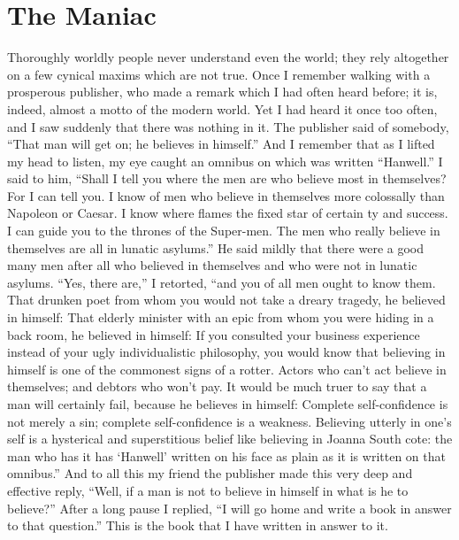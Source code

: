 \documentclass{book}
\begin{document}
\chapter{The Maniac}
\label{chapter-1}
Thoroughly worldly people never understand even the world; they rely altogether on a few cynical maxims which are not true. Once I remember walking with a prosperous publisher, who made a remark which I had often heard before; it is, indeed, almost a motto of the modern world. Yet I had heard it once too often, and I saw suddenly that there was nothing in it. The publisher said of somebody, “That man will get on; he believes in himself.” And I remember that as I lifted my head to listen, my eye caught an omnibus on which was written “Hanwell.” I said to him, “Shall I tell you where the men are who believe most in themselves? For I can tell you. I know of men who believe in themselves more colossally than Napoleon or Caesar. I know where flames the fixed star of certain ty and success. I can guide you to the thrones of the Super-men. The men who really believe in themselves are all in lunatic asylums.” He said mildly that there were a good many men after all who believed in themselves and who were not in lunatic asylums. “Yes, there are,” I retorted, “and you of all men ought to know them. That drunken poet from whom you would not take a dreary tragedy, he believed in himself: That elderly minister with an epic from whom you were hiding in a back room, he believed in himself: If you consulted your business experience instead of your ugly individualistic philosophy, you would know that believing in himself is one of the commonest signs of a rotter. Actors who can’t act believe in themselves; and debtors who won’t pay. It would be much truer to say that a man will certainly fail, because he believes in himself: Complete self-confidence is not merely a sin; complete self-confidence is a weakness. Believing utterly in one’s self is a hysterical and superstitious belief like believing in Joanna South cote: the man who has it has ‘Hanwell’ written on his face as plain as it is written on that omnibus.” And to all this my friend the publisher made this very deep and effective reply, “Well, if a man is not to believe in himself in what is he to believe?” After a long pause I replied, “I will go home and write a book in answer to that question.” This is the book that I have written in answer to it.
\end{document}

